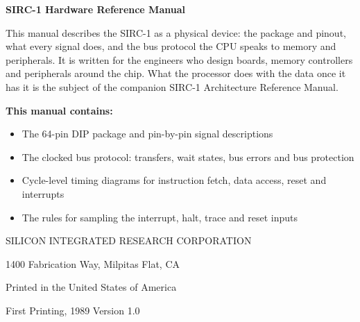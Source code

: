 \clearpage
\thispagestyle{empty}
\begin{center}

	\vspace*{1.5cm}

	{\Large\bfseries SIRC-1 Hardware Reference Manual}

	\vspace{1cm}

	\begin{minipage}{0.8\textwidth}
		This manual describes the SIRC-1 as a physical device: the package and pinout, what every signal does, and the
		bus protocol the CPU speaks to memory and peripherals. It is written for the engineers who design boards, memory
		controllers and peripherals around the chip. What the processor does with the data once it has it is the subject
		of the companion SIRC-1 Architecture Reference Manual.

		\vspace{0.6cm}

		\textbf{This manual contains:}
		\begin{itemize}
			\item The 64-pin DIP package and pin-by-pin signal descriptions
			\item The clocked bus protocol: transfers, wait states, bus errors and bus protection
			\item Cycle-level timing diagrams for instruction fetch, data access, reset and interrupts
			\item The rules for sampling the interrupt, halt, trace and reset inputs
		\end{itemize}
	\end{minipage}

	\vfill

	{\small SILICON INTEGRATED RESEARCH CORPORATION}

	{\small 1400 Fabrication Way, Milpitas Flat, CA}

	{\small Printed in the United States of America}

	\vspace{0.4cm}

	{\small First Printing, 1989 \quad\textbullet\quad Version 1.0}

\end{center}
